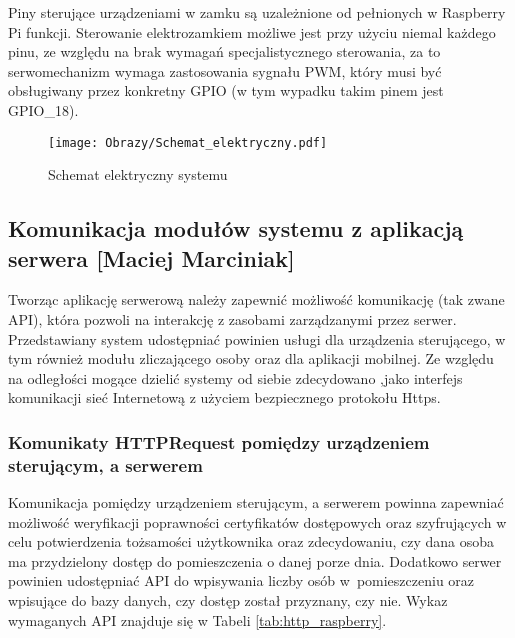 Piny sterujące urządzeniami w zamku są uzależnione od pełnionych w Raspberry Pi funkcji. Sterowanie elektrozamkiem możliwe jest przy użyciu niemal każdego pinu, ze względu na brak wymagań specjalistycznego sterowania, za to serwomechanizm wymaga zastosowania sygnału PWM, który musi być obsługiwany przez konkretny GPIO (w tym wypadku takim pinem jest GPIO\_18).\cite{RP3}
\newpage
\begin{figure}[!h]
	\centering
	\texttt{[image: Obrazy/Schemat\_elektryczny.pdf]}
	\caption{Schemat elektryczny systemu}
	\label{schemat:schemat elektryczny systemu}
\end{figure}
\newpage

\subsection[Komunikacja modułów systemu z aplikacją]{Komunikacja modułów systemu z aplikacją  serwera [Maciej Marciniak]}\label{Komunikacja serwer}
Tworząc aplikację serwerową należy zapewnić możliwość komunikację (tak zwane API), która pozwoli na interakcję z zasobami zarządzanymi przez serwer. Przedstawiany system udostępniać powinien usługi dla urządzenia \linebreak sterującego, w tym również modułu zliczającego osoby oraz dla aplikacji mobilnej. Ze względu na odległości mogące dzielić systemy od siebie zdecydowano ,jako interfejs komunikacji sieć Internetową z użyciem bezpiecznego protokołu Https. 
	\subsubsection{Komunikaty HTTPRequest pomiędzy urządzeniem sterującym, a serwerem}
	Komunikacja pomiędzy urządzeniem sterującym, a serwerem powinna \linebreak zapewniać możliwość weryfikacji poprawności certyfikatów dostępowych oraz \linebreak szyfrujących w celu potwierdzenia tożsamości użytkownika oraz zdecydowaniu, czy dana osoba ma przydzielony dostęp do pomieszczenia o danej porze dnia. Dodatkowo serwer powinien udostępniać API do wpisywania liczby osób \linebreak w~pomieszczeniu oraz wpisujące do bazy danych, czy dostęp został przyznany, czy nie. Wykaz wymaganych API znajduje się w Tabeli \ref{tab:http_raspberry}.
